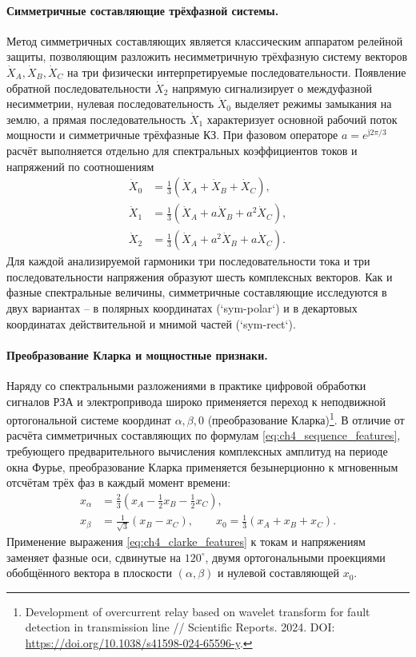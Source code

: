 \paragraph{Симметричные составляющие трёхфазной системы.}
Метод симметричных составляющих является классическим аппаратом релейной
защиты, позволяющим разложить несимметричную трёхфазную систему векторов
$\dot{X}_A, \dot{X}_B, \dot{X}_C$ на три физически интерпретируемые
последовательности. Появление обратной последовательности $\dot{X}_2$
напрямую сигнализирует о междуфазной несимметрии, нулевая
последовательность $\dot{X}_0$ выделяет режимы замыкания на землю, а
прямая последовательность $\dot{X}_1$ характеризует основной рабочий
поток мощности и симметричные трёхфазные КЗ. При фазовом операторе
$a=e^{\mathrm{j}2\pi/3}$ расчёт выполняется отдельно для спектральных
коэффициентов токов и напряжений по соотношениям
\begin{equation}
\begin{aligned}
 \dot{X}_0&=\tfrac13(\dot{X}_A+\dot{X}_B+\dot{X}_C),\\
 \dot{X}_1&=\tfrac13(\dot{X}_A+a\dot{X}_B+a^2\dot{X}_C),\\
 \dot{X}_2&=\tfrac13(\dot{X}_A+a^2\dot{X}_B+a\dot{X}_C).
\end{aligned}
\label{eq:ch4_sequence_features}
\end{equation}
Для каждой анализируемой гармоники три последовательности тока и три
последовательности напряжения образуют шесть комплексных векторов. Как и
фазные спектральные величины, симметричные составляющие исследуются в
двух вариантах -- в полярных координатах (`sym-polar`) и в декартовых
координатах действительной и мнимой частей (`sym-rect`).

\paragraph{Преобразование Кларка и мощностные признаки.}
Наряду со спектральными разложениями в практике цифровой обработки
сигналов РЗА и электропривода широко применяется переход к неподвижной
ортогональной системе координат $\alpha, \beta, 0$ (преобразование
Кларка)\footnote{Development of overcurrent relay based on wavelet
transform for fault detection in transmission line // Scientific Reports.
2024. DOI: \url{https://doi.org/10.1038/s41598-024-65596-y}.}. В отличие
от расчёта симметричных составляющих по формулам
\eqref{eq:ch4_sequence_features}, требующего предварительного вычисления
комплексных амплитуд на периоде окна Фурье, преобразование Кларка
применяется безынерционно к мгновенным отсчётам трёх фаз в каждый момент
времени:
\begin{equation}
\begin{aligned}
 x_\alpha&=\tfrac23(x_A-\tfrac12x_B-\tfrac12x_C),\\
 x_\beta&=\tfrac{1}{\sqrt3}(x_B-x_C),\qquad
 x_0=\tfrac13(x_A+x_B+x_C).
\end{aligned}
\label{eq:ch4_clarke_features}
\end{equation}
Применение выражения \eqref{eq:ch4_clarke_features} к токам и напряжениям
заменяет фазные оси, сдвинутые на $120^\circ$, двумя ортогональными
проекциями обобщённого вектора в плоскости $(\alpha, \beta)$ и нулевой
составляющей $x_0$.

